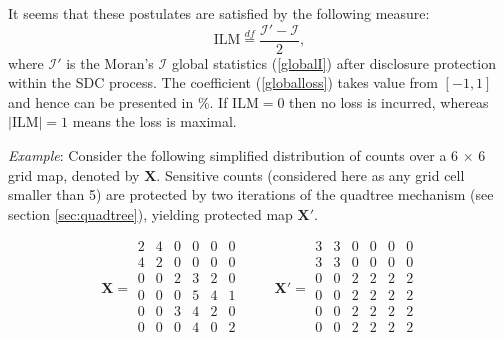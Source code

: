 It seems that these postulates are satisfied by the following measure:
\begin{equation}
\mathrm{ILM}\stackrel{df}{=}\frac{\mathcal{I}'-\mathcal{I}}{2},
\label{globalloss}
\end{equation}
where $\mathcal{I}'$ is the Moran's $\mathcal{I}$ global statistics (\ref{globalI}) after disclosure protection within the SDC process. The coefficient (\ref{globalloss}) takes value from $[-1,1]$ and hence can be presented in \%. If $\mathrm{ILM}=0$ then no loss is incurred, whereas $|\mathrm{ILM}|=1$ means the loss is maximal.

\begin{tcolorbox}[breakable]
\emph{Example}:
Consider the following simplified distribution of counts over a 6 $\times$ 6 grid map, denoted by $\mathbf{X}$. Sensitive counts (considered here as any grid cell smaller than 5) are protected by two iterations of the quadtree mechanism (see section \ref{sec:quadtree}), yielding protected map $\mathbf{X}'$.

\[ 
\mathbf{X} = \begin{matrix} 
2 & 4 & 0 & 0 & 0 & 0\\
4 & 2 & 0 & 0 & 0 & 0\\
0 & 0 & 2 & 3 & 2 & 0\\
0 & 0 & 0 & 5 & 4 & 1\\
0 & 0 & 3 & 4 & 2 & 0\\
0 & 0 & 0 & 4 & 0 & 2\\
\end{matrix}
\hspace{1cm}
\mathbf{X}' = \begin{matrix} 
3 & 3 & 0 & 0 & 0 & 0\\
3 & 3 & 0 & 0 & 0 & 0\\
0 & 0 & 2 & 2 & 2 & 2\\
0 & 0 & 2 & 2 & 2 & 2\\
0 & 0 & 2 & 2 & 2 & 2\\
0 & 0 & 2 & 2 & 2 & 2\\
\end{matrix}
\]


\end{tcolorbox}
